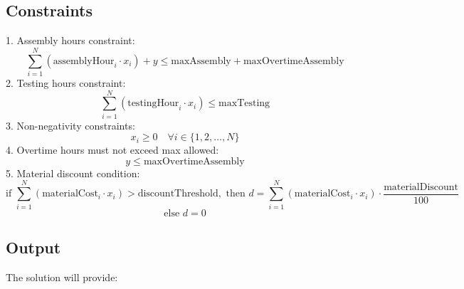 \documentclass{article}
\begin{document}
\subsection*{Constraints}
1. Assembly hours constraint:
\[
\sum_{i=1}^{N} (\text{assemblyHour}_i \cdot x_i) + y \leq \text{maxAssembly} + \text{maxOvertimeAssembly}
\]
2. Testing hours constraint:
\[
\sum_{i=1}^{N} (\text{testingHour}_i \cdot x_i) \leq \text{maxTesting}
\]
3. Non-negativity constraints:
\[
x_i \geq 0 \quad \forall i \in \{1, 2, \ldots, N\}
\]
4. Overtime hours must not exceed max allowed:
\[
y \leq \text{maxOvertimeAssembly}
\]
5. Material discount condition:
\[
\text{if } \sum_{i=1}^{N} (\text{materialCost}_i \cdot x_i) > \text{discountThreshold}, \text{ then } d = \sum_{i=1}^{N} (\text{materialCost}_i \cdot x_i) \cdot \frac{\text{materialDiscount}}{100}
\]
\[
\text{else } d = 0
\]

\subsection*{Output}
The solution will provide:
\end{document}
